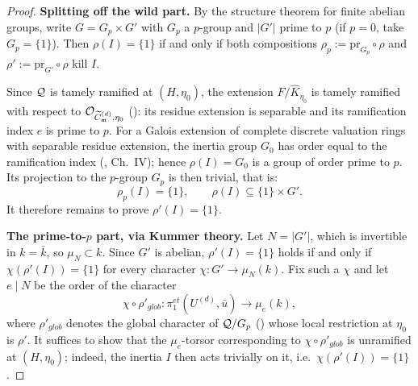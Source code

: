 \begin{proof}
    \textbf{Splitting off the wild part.}
    By the structure theorem for finite abelian groups, write $G = G_p \times G'$ with $G_p$ a $p$-group
    and $|G'|$ prime to $p$ (if $p = 0$, take $G_p = \{1\}$). Then
    $\rho(I) = \{1\}$ if and only if both compositions
    $\rho_p := \mathrm{pr}_{G_p} \circ \rho$ and $\rho' := \mathrm{pr}_{G'} \circ \rho$ kill $I$.

    Since $\mathcal{Q}$ is tamely ramified at $(H, \eta_0)$, the extension $F/\widehat{K}_{\eta_0}$ is tamely
    ramified with respect to $\mathcal{O}_{\widetilde{C}_{\mathfrak{m}}^{(d)}, \eta_0}$ (): its
    residue extension is separable and its ramification index $e$ is prime to $p$. For a Galois
    extension of complete discrete valuation rings with separable residue extension, the inertia group
    $G_0$ has order equal to the ramification index (\cite{serreLF}, Ch.\ IV); hence
    $\rho(I) = G_0$ is a group of order prime to $p$. Its projection to the $p$-group $G_p$ is then
    trivial, that is:
    \[ \rho_p(I) = \{1\}, \qquad \rho(I) \subseteq \{1\} \times G'. \]
    It therefore remains to prove $\rho'(I) = \{1\}$.

    \textbf{The prime-to-$p$ part, via Kummer theory.}
    Let $N = |G'|$, which is invertible in $k = \bar{k}$, so $\mu_N \subset k$. Since $G'$ is abelian,
    $\rho'(I) = \{1\}$ holds if and only if $\chi(\rho'(I)) = \{1\}$ for every character
    $\chi : G' \to \mu_N(k)$. Fix such a $\chi$ and let $e \mid N$ be the order of the character
    \[ \chi \circ \rho'_{glob} : \pi_1^{et}(U^{(d)}, \bar{u}) \longrightarrow \mu_e(k), \]
    where $\rho'_{glob}$ denotes the global character of $\mathcal{Q} / G_p$ ()
    whose local restriction at $\eta_0$ is $\rho'$. It suffices to show that the $\mu_e$-torsor
    corresponding to $\chi \circ \rho'_{glob}$ is unramified at $(H, \eta_0)$; indeed, the inertia $I$
    then acts trivially on it, i.e.\ $\chi(\rho'(I)) = \{1\}$.


\end{proof}
